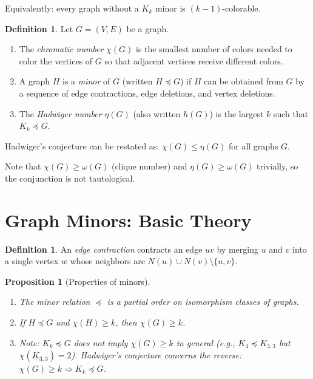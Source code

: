 \documentclass[12pt,a4paper]{amsart}
\newtheorem{proposition}[theorem]{Proposition}
\theoremstyle{definition}
\newtheorem{definition}[theorem]{Definition}
\theoremstyle{remark}
\begin{document}
Equivalently: every graph without a $K_k$ minor is $(k-1)$-colorable.

\begin{definition}
Let $G = (V,E)$ be a graph.
\begin{enumerate}[label=(\alph*)]
  \item The \emph{chromatic number} $\chi(G)$ is the smallest number of colors
        needed to color the vertices of $G$ so that adjacent vertices receive
        different colors.
  \item A graph $H$ is a \emph{minor} of $G$ (written $H \preceq G$) if $H$ can
        be obtained from $G$ by a sequence of edge contractions, edge deletions,
        and vertex deletions.
  \item The \emph{Hadwiger number} $\eta(G)$ (also written $h(G)$) is the largest
        $k$ such that $K_k \preceq G$.
\end{enumerate}
\end{definition}

Hadwiger's conjecture can be restated as: $\chi(G) \leq \eta(G)$ for all graphs $G$.

Note that $\chi(G) \geq \omega(G)$ (clique number) and $\eta(G) \geq \omega(G)$
trivially, so the conjunction is not tautological.

\section{Graph Minors: Basic Theory}

\begin{definition}
An \emph{edge contraction} contracts an edge $uv$ by merging $u$ and $v$ into
a single vertex $w$ whose neighbors are $N(u) \cup N(v) \setminus \{u,v\}$.
\end{definition}

\begin{proposition}[Properties of minors]\label{prop:minorprop}
\begin{enumerate}[label=(\roman*)]
  \item The minor relation $\preceq$ is a partial order on isomorphism classes
        of graphs.
  \item If $H \preceq G$ and $\chi(H) \geq k$, then $\chi(G) \geq k$.
  \item Note: $K_k \preceq G$ does \emph{not} imply $\chi(G) \geq k$ in general
        (e.g., $K_4 \preceq K_{3,3}$ but $\chi(K_{3,3}) = 2$).
        Hadwiger's conjecture concerns the reverse: $\chi(G) \geq k \Rightarrow K_k \preceq G$.
\end{enumerate}
\end{proposition}
\end{document}
